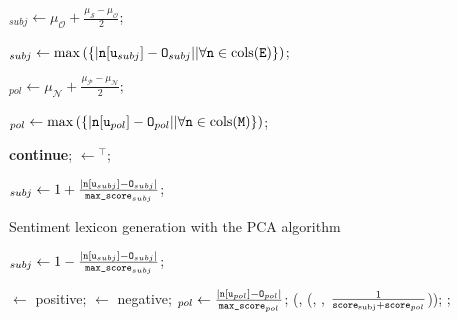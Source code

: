 \begin{algorithm}
\begin{algorithmic}[1]
    \State{}$_{subj}\gets\mu_{\mathcal{O}} + \frac{\mu_{\mathcal{S}} -
    \mu_{\mathcal{O}}}{2}$;

    \State{}$_{subj}\gets\max\left(\{|\vars{n}\lbrack\vars{u}_{subj}\rbrack%
      - \vars{O}_{subj}| |\forall\vars{n}\in\func{cols}(\vars{E})\}\right)$;

    \State{}$_{pol}\gets\mu_{\mathcal{N}} + \frac{\mu_{\mathcal{P}} -
    \mu_{\mathcal{N}}}{2}$;

    \State{}$_{pol}\gets\max\left(\{|\vars{n}\lbrack\vars{u}_{pol}\rbrack%
      - \vars{O}_{pol}| |\forall\vars{n}\in\func{cols}(\vars{M})\}\right)$;

    \State \textbf{continue};
    \EndIf
    \State {}$\gets$$^\top$;


    \State{}$_{subj}\gets 1 + %
    \frac{|\vars{n}\lbrack\vars{u}_{subj}\rbrack - \vars{O}_{subj}|}{\vars{max\_score}_{subj}}$;
  \end{algorithmic}
  \caption[Sentiment lexicon generation using PCA]{Sentiment lexicon
    generation with the PCA algorithm}\label{snt:lex:alg:pca}
\end{algorithm}

\begin{algorithm}
  \begin{algorithmic}[1]
    \Else
    \State{}$_{subj}\gets 1 - %
    \frac{|\vars{n}\lbrack\vars{u}_{subj}\rbrack - \vars{O}_{subj}|}{\vars{max\_score}_{subj}}$;
    \EndIf


    \State{}$\gets$ positive;
    \Else
    \State {}$\gets$ negative;
    \EndIf
    \State{}$_{pol}\gets%
    \frac{|\vars{n}\lbrack\vars{u}_{pol}\rbrack %
      - \vars{O}_{pol}|}{\vars{max\_score}_{pol}}$;
    \State{}(,
    (, , %
    $\frac{1}{\texttt{score}_{\textrm{subj}} + \texttt{score}_{pol}}$));
    \Statex{}
    \EndFor
    \State\Return{};
    \EndFunction
  \end{algorithmic}
\end{algorithm}

